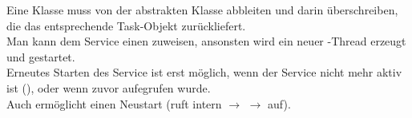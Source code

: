 \noindent
Eine Klasse muss von der abstrakten Klasse  abbleiten und darin  überschreiben, die das entsprechende Task-Objekt zurückliefert.\\

\noindent
Man kann dem Service einen  zuweisen, ansonsten wird ein neuer -Thread erzeugt und gestartet.\\

\noindent
Erneutes Starten des Service ist erst möglich, wenn der Service nicht mehr aktiv ist (), oder wenn zuvor  aufegrufen wurde.\\
Auch  ermöglicht einen Neustart (ruft intern  $\rightarrow$  $\rightarrow$  auf).